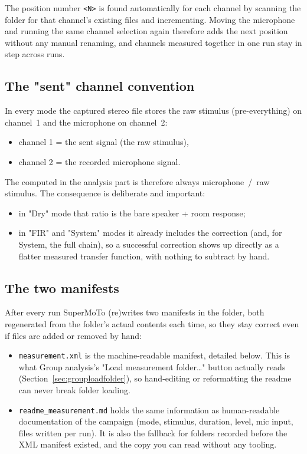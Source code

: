 \noindent The position number \texttt{<N>} is found automatically for each channel by scanning the folder for that channel's existing files and incrementing. Moving the microphone and running the same channel selection again therefore adds the next position without any manual renaming, and channels measured together in one run stay in step across runs.

\subsection{The "sent" channel convention}
In every mode the captured stereo file stores the raw stimulus (pre-everything) on channel~1 and the microphone on channel~2:

\begin{itemize}[nosep]
  \item channel 1 = the sent signal (the raw stimulus),
  \item channel 2 = the recorded microphone signal.
\end{itemize}

\noindent The  computed in the analysis part is therefore always microphone~/~raw\,stimulus. The consequence is deliberate and important:
\begin{itemize}[nosep]
  \item in "Dry" mode that ratio is the bare speaker + room response;
  \item in "FIR" and "System" modes it already includes the correction (and, for System, the full chain), so a successful correction shows up directly as a flatter measured transfer function, with nothing to subtract by hand.
\end{itemize}

\subsection{The two manifests}
After every run SuperMoTo (re)writes two manifests in the folder, both regenerated from the folder's actual contents each time, so they stay correct even if files are added or removed by hand:

\begin{itemize}[nosep]
  \item \texttt{measurement.xml} is the machine-readable manifest, detailed below. This is what Group analysis's "Load measurement folder\ldots" button actually reads (Section~\ref{sec:grouploadfolder}), so hand-editing or reformatting the readme can never break folder loading.
  \item \texttt{readme\_measurement.md} holds the same information as human-readable documentation of the campaign (mode, stimulus, duration, level, mic input, files written per run). It is also the fallback for folders recorded before the XML manifest existed, and the copy you can read without any tooling.
\end{itemize}

